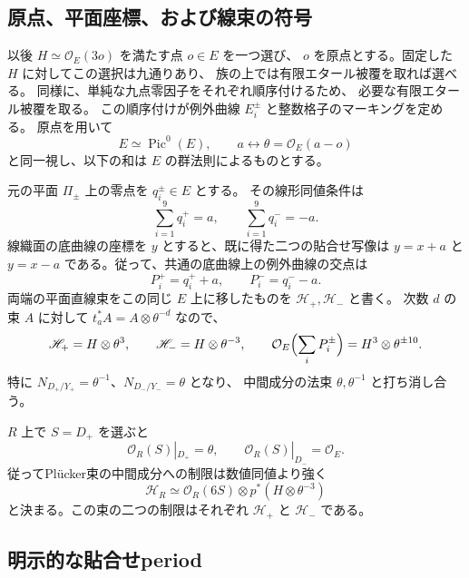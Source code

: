 \subsection{原点、平面座標、および線束の符号}

以後 $H\simeq\mathcal O_E(3o)$ を満たす点 $o\in E$ を一つ選び、
$o$ を原点とする。固定した $H$ に対してこの選択は九通りあり、
族の上では有限エタール被覆を取れば選べる。
同様に、単純な九点零因子をそれぞれ順序付けるため、
必要な有限エタール被覆を取る。
この順序付けが例外曲線 $E_i^\pm$ と整数格子のマーキングを定める。
原点を用いて
\[
 E\simeq\operatorname{Pic}^0(E),\qquad
 a\longleftrightarrow\theta=\mathcal O_E(a-o)
\]
と同一視し、以下の和は $E$ の群法則によるものとする。

元の平面 $\Pi_\pm$ 上の零点を $q_i^\pm\in E$ とする。
その線形同値条件は
\begin{equation}
 \sum_{i=1}^9q_i^+=a,\qquad
 \sum_{i=1}^9q_i^-=-a.
 \label{eq:sum-points-v30}
\end{equation}
線織面の底曲線の座標を $y$ とすると、既に得た二つの貼合せ写像は
$y=x+a$ と $y=x-a$ である。従って、共通の底曲線上の例外曲線の交点は
\begin{equation}
 P_i^+=q_i^++a,\qquad P_i^-=q_i^--a.
 \label{eq:translated-points-v30}
\end{equation}
両端の平面直線束をこの同じ $E$ 上に移したものを
$\mathscr H_+,\mathscr H_-$ と書く。
次数 $d$ の束 $A$ に対して $t_a^*A=A\otimes\theta^{-d}$ なので、
\begin{equation}
 \mathscr H_+=H\otimes\theta^3,\qquad
 \mathscr H_-=H\otimes\theta^{-3},
 \qquad
 \mathcal O_E\Bigl(\sum_iP_i^\pm\Bigr)
     =H^3\otimes\theta^{\pm10}.
 \label{eq:translated-bundles-v30}
\end{equation}
特に
$N_{D_+/Y_+}=\theta^{-1}$、$N_{D_-/Y_-}=\theta$ となり、
中間成分の法束 $\theta,\theta^{-1}$ と打ち消し合う。

$R$ 上で $S=D_+$ を選ぶと
\[
 \mathcal O_R(S)|_{D_+}=\theta,\qquad
 \mathcal O_R(S)|_{D_-}=\mathcal O_E.
\]
従ってPl\"ucker束の中間成分への制限は数値同値より強く
\begin{equation}
 \mathscr H_R\simeq
 \mathcal O_R(6S)\otimes p^*(H\otimes\theta^{-3})
 \label{eq:plucker-exact-v30}
\end{equation}
と決まる。この束の二つの制限はそれぞれ
$\mathscr H_+$ と $\mathscr H_-$ である。

\subsection{明示的な貼合せperiod}

